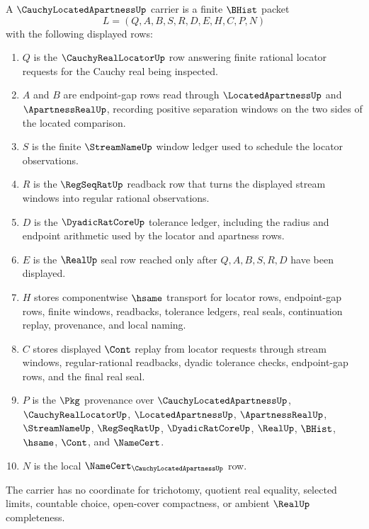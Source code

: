 \begin{definition}
\label{def:cauchy-located-apartness-carrier}
A $\CauchyLocatedApartnessUp$ carrier is a finite $\BHist$ packet
$$
L=(Q,A,B,S,R,D,E,H,C,P,N)
$$
with the following displayed rows:
\begin{enumerate}
\item $Q$ is the $\CauchyRealLocatorUp$ row answering finite rational locator requests for the Cauchy real being inspected.
\item $A$ and $B$ are endpoint-gap rows read through $\LocatedApartnessUp$ and $\ApartnessRealUp$, recording positive separation windows on the two sides of the located comparison.
\item $S$ is the finite $\StreamNameUp$ window ledger used to schedule the locator observations.
\item $R$ is the $\RegSeqRatUp$ readback row that turns the displayed stream windows into regular rational observations.
\item $D$ is the $\DyadicRatCoreUp$ tolerance ledger, including the radius and endpoint arithmetic used by the locator and apartness rows.
\item $E$ is the $\RealUp$ seal row reached only after $Q,A,B,S,R,D$ have been displayed.
\item $H$ stores componentwise $\hsame$ transport for locator rows, endpoint-gap rows, finite windows, readbacks, tolerance ledgers, real seals, continuation replay, provenance, and local naming.
\item $C$ stores displayed $\Cont$ replay from locator requests through stream windows, regular-rational readbacks, dyadic tolerance checks, endpoint-gap rows, and the final real seal.
\item $P$ is the $\Pkg$ provenance over $\CauchyLocatedApartnessUp$, $\CauchyRealLocatorUp$, $\LocatedApartnessUp$, $\ApartnessRealUp$, $\StreamNameUp$, $\RegSeqRatUp$, $\DyadicRatCoreUp$, $\RealUp$, $\BHist$, $\hsame$, $\Cont$, and $\NameCert$.
\item $N$ is the local $\NameCert_{\CauchyLocatedApartnessUp}$ row.
\end{enumerate}
The carrier has no coordinate for trichotomy, quotient real equality, selected limits, countable choice, open-cover compactness, or ambient $\RealUp$ completeness.
\end{definition}

